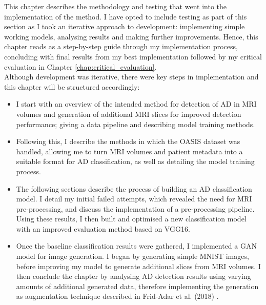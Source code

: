 \documentclass[
    author={Kai Hulme},
    supervisor={Dr Jon Bird},
    degree={BSc},
    title={Generative Adversarial Networks as an Augmentation Technique},
    subtitle={for Alzheimer's Disease Detection in MRI Volumes},
    type={Research},
    year={2021} 
]{dissertation}
\begin{document}
This chapter describes the methodology and testing that went into the implementation of the method. I have opted to include testing as part of this section as I took an iterative approach to development: implementing simple working models, analysing results and making further improvements. Hence, this chapter reads as a step-by-step guide through my implementation process, concluding with final results from my best implementation followed by my critical evaluation in Chapter \ref{chap:critical_evaluation}. \\

Although development was iterative, there were key steps in implementation and this chapter will be structured accordingly:

\begin{itemize}

    \item I start with an overview of the intended method for detection of AD in MRI volumes and generation of additional MRI slices for improved detection performance; giving a data pipeline and describing model training methods.
    
    \item Following this, I describe the methods in which the OASIS dataset was handled, allowing me to turn MRI volumes and patient metadata into a suitable format for AD classification, as well as detailing the model training process.
    
   \item The following sections describe the process of building an AD classification model. I detail my initial failed attempts, which revealed the need for MRI pre-processing, and discuss the implementation of a pre-processing pipeline. Using these results, I then built and optimised a new classification model with an improved evaluation method based on VGG16. 
    
    \item Once the baseline classification results were gathered, I implemented a GAN model for image generation. I began by generating simple MNIST images, before improving my model to generate additional slices from MRI volumes. I then conclude the chapter by analysing AD detection results using varying amounts of additional generated data, therefore implementing the generation as augmentation technique described in Frid-Adar et al. (2018) \cite{frid2018gan}.
    
\end{itemize}

\end{document}
